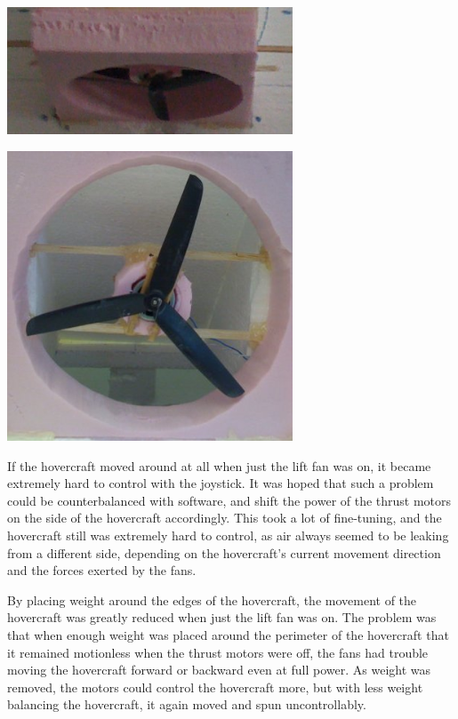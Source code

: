 \begin{minipage}{6.5in}
\begin{minipage}{6.5in}
\begin{minipage}{6.5in}
\begin{center}
  \includegraphics[width=85mm]{imageSources/weightDistro1.png}
\end{center}
\label{weightDistro1}
\end{minipage}

\begin{minipage}
\begin{center}
  \includegraphics[width=85mm]{imageSources/weightDistro2.png}
\end{center}
\label{weightDistro2}
\end{minipage}

If the hovercraft moved around at all when just the lift fan was on, it became extremely hard to control with the joystick. It was hoped that such a problem could be counterbalanced with software, and shift the power of the thrust motors on the side of the hovercraft accordingly. This took a lot of fine-tuning, and the hovercraft still was extremely hard to control, as air always seemed to be leaking from a different side, depending on the hovercraft's current movement direction and the forces exerted by the fans.

By placing weight around the edges of the hovercraft, the movement of the hovercraft was greatly reduced when just the lift fan was on. The problem was that when enough weight was placed around the perimeter of the hovercraft that it remained motionless when the thrust motors were off, the fans had trouble moving the hovercraft forward or backward even at full power. As weight was removed, the motors could control the hovercraft more, but with less weight balancing the hovercraft, it again moved and spun uncontrollably.


\end{minipage}
\end{minipage}
